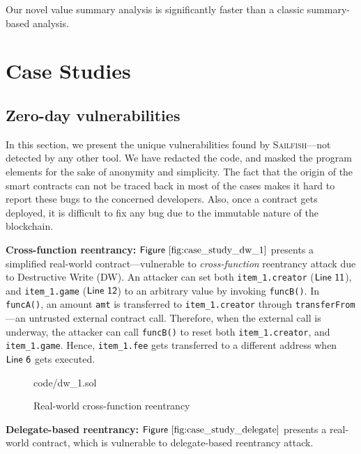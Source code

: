 \documentclass[conference, romanappendices]{tex/IEEEtran}
\theoremstyle{bfnote}
\newcommand{\toolname}{\textsc{Sailfish}\xspace}
\newcommand{\smart}{smart contract}
\newcommand{\reentrancy}{{reentrancy}\xspace}
\newcommand{\Line}[1]{\ensuremath{\sf Line~ #1}}
\newcommand{\Fig}[1]{\ensuremath{\sf Figure~\ref{#1}}}
\begin{document}
\begin{mdframed}[style=graybox]
	Our novel value summary analysis is significantly faster than a classic summary-based analysis.
\end{mdframed}

\section{Case Studies}
\label{app:case_studies}
\subsection{Zero-day vulnerabilities}
\label{sec:case_study_zero_day}
\noindent
In this section, we present the unique vulnerabilities found by \toolname---not detected by any other tool.
We have redacted the code, and masked the program elements for the sake of anonymity and simplicity.
The fact that the origin of the \smart s can not be traced back in most of the cases makes it hard to report these bugs to the concerned developers.
Also, once a contract gets deployed, it is difficult to fix any bug due to the immutable nature of the blockchain.


\noindent
\textbf{Cross-function \reentrancy:}
\Fig{fig:case_study_dw_1} presents a simplified real-world contract---vulnerable to \textit{cross-function} \reentrancy attack due to Destructive Write (DW).
An attacker can set both \texttt{item\_1.creator} (\Line{11}), and \texttt{item\_1.game} (\Line{12}) to an arbitrary value by invoking \texttt{funcB()}.
In \texttt{funcA()}, an amount \texttt{amt} is transferred to \texttt{item\_1.creator} through \texttt{transferFrom}---an untrusted external contract call.
Therefore, when the external call is underway, the attacker can call \texttt{funcB()} to reset both \texttt{item\_1.creator}, and \texttt{item\_1.game}.
Hence, \texttt{item\_1.fee} gets transferred to a different address when \Line{6} gets executed.

\begin{figure}[h]
	\vspace{-5mm}
	
	{code/dw_1.sol}
	\vspace{-7mm}
	\caption{Real-world cross-function \reentrancy
	}
	\label{fig:case_study_dw_1}
	\vspace{-3mm}
\end{figure}

\noindent
\textbf{Delegate-based \reentrancy:} \Fig{fig:case_study_delegate} presents a real-world contract, which is vulnerable to delegate-based \reentrancy attack.
\end{document}
